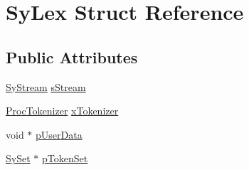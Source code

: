\hypertarget{struct_sy_lex}{\section{Sy\-Lex Struct Reference}
\label{d6/df8/struct_sy_lex}
}
\subsection*{Public Attributes}
\begin{DoxyCompactItemize}
\item 
\hyperlink{struct_sy_stream}{Sy\-Stream} \hyperlink{struct_sy_lex_a1d2e068265daed97ed8963febdaef1da}{s\-Stream}
\item 
\hyperlink{unqlite_8c_a13ac5743a2c610351322bc4eac27a30f}{Proc\-Tokenizer} \hyperlink{struct_sy_lex_afa083e3c899daf68c19c2ac03a89b457}{x\-Tokenizer}
\item 
void $\ast$ \hyperlink{struct_sy_lex_a0d80f24013812f065621076dc5f6b512}{p\-User\-Data}
\item 
\hyperlink{struct_sy_set}{Sy\-Set} $\ast$ \hyperlink{struct_sy_lex_a24d38ba9709d1426be3ee101bbab42a6}{p\-Token\-Set}
\end{DoxyCompactItemize}


